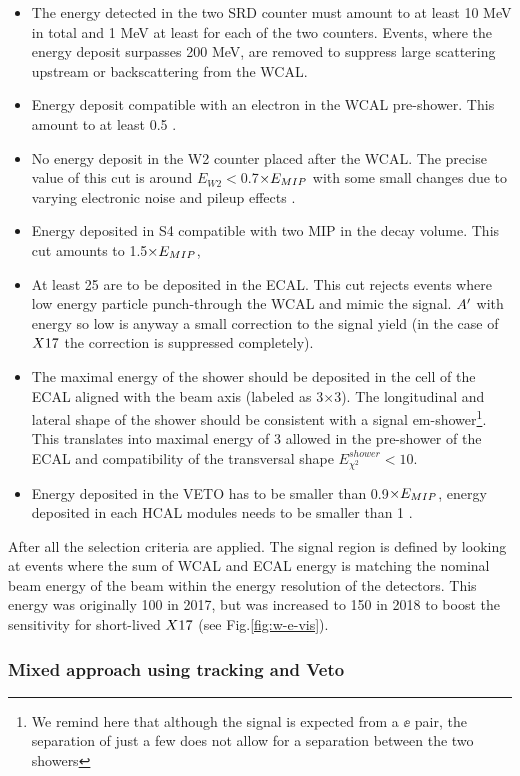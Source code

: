 \begin{itemize}
\item The energy detected in the two SRD counter must amount to at least 10 MeV in total and 1 MeV at least for each of the two counters. Events, where the energy deposit surpasses 200 MeV, are removed to suppress large scattering upstream or backscattering from the WCAL.
\item Energy deposit compatible with an electron in the WCAL pre-shower. This amount to at least 0.5 \gev.
\item  No energy deposit in the W2 counter placed after the WCAL. The precise value of this cut is around $E_{W2} < $0.7$\times E_{MIP}$ with some small changes due to varying electronic noise and pileup effects \cite{Banerjee:2019hmi}.
\item Energy deposited in S4 compatible with two MIP in the decay volume. This cut amounts to 1.5$\times E_{MIP}$,
\item At least 25 \gev are to be deposited in the ECAL. This cut rejects events where low energy particle punch-through the WCAL and mimic the signal. $A'$ with energy so low is anyway a small correction to the signal yield (in the case of $X17$ the correction is suppressed completely).
\item The maximal energy of the shower should be deposited in the cell of the ECAL aligned with the beam axis (labeled as 3$\times$3). The longitudinal and lateral shape of the shower should be consistent with a signal em-shower\footnote{We remind here that although the signal is expected from a $\ee$ pair, the separation of just a few \mmi does not allow for a separation between the two showers}. This translates into maximal energy of 3 \gev allowed in the pre-shower of the ECAL and compatibility of the transversal shape $E^{shower}_{\chi^2} < 10$.
\item Energy deposited in the VETO has to be smaller than 0.9$\times E_{MIP}$, energy deposited in each HCAL modules needs to be smaller than 1 \gev.
\end{itemize}

After all the selection criteria are applied. The signal region is defined by looking at events where the sum of WCAL and ECAL energy is matching the nominal beam energy of the beam within the energy resolution of the detectors. This energy was originally 100 \gev in 2017, but was increased to 150 \gev in 2018 to boost the sensitivity for short-lived $X17$ (see Fig.\ref{fig:w-e-vis}).

\subsubsection{Mixed approach using tracking and Veto}
\label{ch3:sec:vis-mode-tracking}

